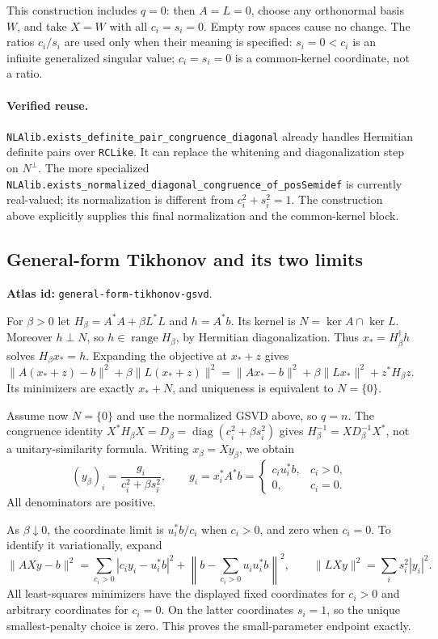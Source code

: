 \documentclass[11pt,a4paper]{article}
\DeclareMathOperator{\diag}{diag}
\DeclareRobustCommand{\code}[1]{{\footnotesize\urlstyle{tt}\nolinkurl{#1}}}
\begin{document}
This construction includes $q=0$: then $A=L=0$, choose any orthonormal
basis $W$, and take $X=W$ with all $c_i=s_i=0$. Empty row spaces cause
no change. The ratios $c_i/s_i$ are used only when their meaning is
specified: $s_i=0<c_i$ is an infinite generalized singular value;
$c_i=s_i=0$ is a common-kernel coordinate, not a ratio.

\paragraph{Verified reuse.}
\code{NLAlib.exists_definite_pair_congruence_diagonal} already handles
Hermitian definite pairs over \code{RCLike}. It can replace the whitening
and diagonalization step on $N^\perp$. The more specialized
\code{NLAlib.exists_normalized_diagonal_congruence_of_posSemidef}
is currently real-valued; its normalization is different from
$c_i^2+s_i^2=1$. The construction above explicitly supplies this final
normalization and the common-kernel block.

\subsection{General-form Tikhonov and its two limits}
\label{sec:eq-general-tikhonov}
\textbf{Atlas id:} \code{general-form-tikhonov-gsvd}.

For $\beta>0$ let $H_\beta=A^*A+\beta L^*L$ and $h=A^*b$.
Its kernel is $N=\ker A\cap\ker L$. Moreover $h\perp N$, so
$h\in\operatorname{range}H_\beta$, by Hermitian diagonalization.
Thus $x_*=H_\beta^\dagger h$ solves $H_\beta x_*=h$.
Expanding the objective at $x_*+z$ gives
\[
 \|A(x_*+z)-b\|^2+\beta\|L(x_*+z)\|^2
 =\|Ax_*-b\|^2+\beta\|Lx_*\|^2+z^*H_\beta z.
\]
Its minimizers are exactly $x_*+N$, and uniqueness is equivalent to
$N=\{0\}$.

Assume now $N=\{0\}$ and use the normalized GSVD above, so $q=n$.
The congruence identity
$X^*H_\beta X=D_\beta=\diag(c_i^2+\beta s_i^2)$ gives
$H_\beta^{-1}=X D_\beta^{-1}X^*$, not a unitary-similarity formula.
Writing $x_\beta=Xy_\beta$, we obtain
\[
 (y_\beta)_i=\frac{g_i}{c_i^2+\beta s_i^2},\qquad
 g_i=x_i^*A^*b=
 \begin{cases}c_i u_i^*b,&c_i>0,\\0,&c_i=0.\end{cases}
\]
All denominators are positive.

As $\beta\downarrow0$, the coordinate limit is $u_i^*b/c_i$ when
$c_i>0$, and zero when $c_i=0$. To identify it variationally, expand
\[
 \|AXy-b\|^2
 =\sum_{c_i>0}|c_i y_i-u_i^*b|^2
   +\left\|b-\sum_{c_i>0}u_i u_i^*b\right\|^2,
 \qquad \|LXy\|^2=\sum_i s_i^2|y_i|^2.
\]
All least-squares minimizers have the displayed fixed coordinates for
$c_i>0$ and arbitrary coordinates for $c_i=0$. On the latter coordinates
$s_i=1$, so the unique smallest-penalty choice is zero. This proves the
small-parameter endpoint exactly.
\end{document}
